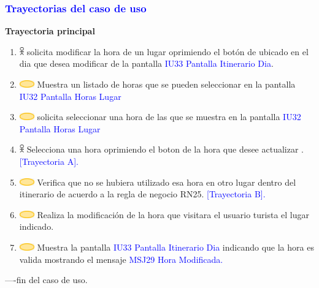 \pagebreak
\subsubsection{\textcolor{blue}{Trayectorias del caso de uso}}

\textbf{Trayectoria principal}
\begin{enumerate}

\item \includegraphics[width=0.0150\textwidth]{Figuras/persona.png} solicita modificar la hora de un lugar oprimiendo el botón de \textbf{} ubicado en el dia que desea modificar de la pantalla \textcolor{blue}{ IU33 Pantalla Itinerario Dia}.

\item \includegraphics[width=0.0500\textwidth]{Figuras/sistema.png} Muestra un listado de horas que se pueden seleccionar en la pantalla \textcolor{blue}{IU32 Pantalla Horas Lugar}

\item \includegraphics[width=0.0500\textwidth]{Figuras/sistema.png} solicita seleccionar una hora de las que se muestra en la pantalla \textcolor{blue}{IU32 Pantalla Horas Lugar}

\item \includegraphics[width=0.0150\textwidth]{Figuras/persona.png} Selecciona una hora oprimiendo el boton de la hora que desee actualizar .\textcolor{blue}{[Trayectoria A].}

\item \includegraphics[width=0.0500\textwidth]{Figuras/sistema.png} Verifica que no se hubiera utilizado esa hora en otro lugar dentro del itinerario de acuerdo a la regla de negocio RN25. \textcolor{blue}{[Trayectoria B].}

\item \includegraphics[width=0.0500\textwidth]{Figuras/sistema.png} Realiza la modificación de la hora que visitara el usuario turista el lugar indicado.

\item \includegraphics[width=0.0500\textwidth]{Figuras/sistema.png} Muestra la pantalla \textcolor{blue}{ IU33 Pantalla Itinerario Dia} indicando que la hora es valida mostrando el mensaje \textcolor{blue}{MSJ29 Hora Modificada.}

\end{enumerate}
----fin del caso de uso. \\

